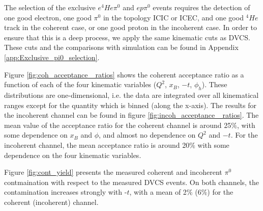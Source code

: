 The selection of the exclusive $e^{4}He\pi^{0}$ and $ep\pi^{0}$ events requires 
the detection of one good electron, one good $\pi^{0}$ in the topology ICIC or 
ICEC, and one good $^{4}He$ track in the coherent case, or one good proton in 
the incoherent case. In order to ensure that this is a deep process, we apply 
the same kinematic cuts as DVCS. These cuts and the comparisons with simulation 
can be found in Appendix \ref{app:Exclusive_pi0_selection}.


Figure \ref{fig:coh_acceptance _ratios} shows the coherent acceptance ratio as 
a function of each of the four kinematic variables ($Q^{2}$, $x_{B}$, $-t$, 
$\phi_{h}$). These distributions are one-dimensional, i.e. the data are 
integrated over all kinematical ranges except for the quantity which is binned 
(along the x-axis). The results for the incoherent channel can be found in 
figure \ref{fig:incoh_acceptance _ratios}. The mean value of the acceptance 
ratio for the coherent channel is around 25$\%$, with some dependence on 
$x_{B}$ and $\phi$, and almost no dependence on $Q^{2}$ and $-t$. For the 
incoherent channel, the mean acceptance ratio is around 20$\%$ with some 
dependence on the four kinematic variables.

Figure \ref{fig:cont_yield} presents the measured coherent and incoherent 
$\pi^{0}$ contmaination with respect to the measured DVCS events. On both 
channels, the contamination increases strongly with -$t$, with a mean of 2$\%$ 
(6$\%$) for the coherent (incoherent) channel. 


